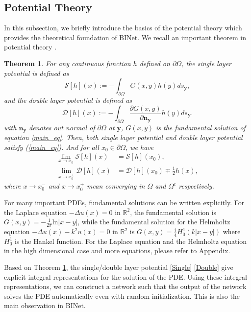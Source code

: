 \documentclass[hyperref]{article}
\numberwithin{equation}{section}
\theoremstyle{nonumberplain}
\newtheorem{theorem}{Theorem}[section]
\begin{document}
	\subsection{Potential Theory}
	In this subsection, we briefly introduce the basics of the potential theory which provides the theoretical foundation of BINet. 
	We recall an important theorem in potential theory \cite{kellogg1953foundations}.
	\begin{theorem}\label{thm.potential}
		For any continuous function $h$ defined on $\partial\Omega$, the single layer potential is defined as
		\begin{equation}
			\mathcal{S}[h](x):=-\int_{\partial\Omega} G(x,y) h(y) d s_{\boldsymbol{y}}, \label{Single}  
		\end{equation}
		and the double layer potential is defined as
		\begin{equation}
			\mathcal{D}[h](x):=-\int_{\partial\Omega} \frac{\partial G(x,y) }{\partial \boldsymbol{n}_{\boldsymbol{y}}} h(y) d s_{\boldsymbol{y}}.
			\label{Double}
		\end{equation}
		with $\boldsymbol{n}_{\boldsymbol{y}}$ denotes out normal of $\partial \Omega$ at $\boldsymbol{y}$, $G(x,y)$ is the fundamental solution of equation \eqref{main_eq}. Then, both single layer potential and double layer potential satisfy (\ref{main_eq}). 
		And for all $x_0\in\partial\Omega$, we have
		\begin{equation}\label{thm:Property}
			\begin{aligned}
				\lim_{x\to x_0}\mathcal{S}[h](x) & = \mathcal{S}[h](x_0),\\
				\lim_{x\to x_0^\pm}\mathcal{D}[h](x) & = \mathcal{D}[h](x_0)\mp\frac{1}{2}h(x),
			\end{aligned}
		\end{equation}
		where $x\to x_0^-$ and $x\to x_0^+$ mean converging in $\Omega$ and $\Omega^c$ respectively.
	\end{theorem}
	For many important PDEs, fundamental solutions can be written explicitly. For the Laplace equation $-\Delta u(x)=0$ in $\mathbb{R}^2$, the fundamental solution is $G(x,y)=-\frac{1}{2\pi}\text{ln}|x-y|$, while the fundamental solution for the Helmholtz equation $-\Delta u(x)-k^2u(x)=0$ in $\mathbb{R}^2$ is $G(x,y)=\frac{i}{4}H_0^1(k|x-y|)$ where $H^1_0$ is the Hankel function. For the Laplace equation and the Helmholtz equation in the high dimensional case and more equations, please refer to Appendix.
	
	
	Based on Theorem \ref{thm.potential}, the single/double layer potential \eqref{Single} \eqref{Double} give explicit integral representations for the solution of the PDE. Using these integral representations, we can construct a network such that the output of the network solves the PDE automatically even with random initialization. This is also the main observation in BINet.
	
\end{document}
